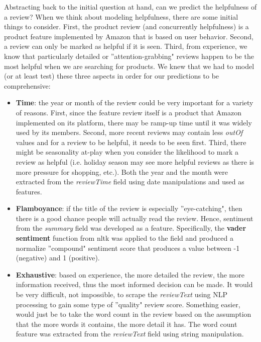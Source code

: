 \documentclass[12pt]{article}
\theoremstyle{plain}
\theoremstyle{definition}
\numberwithin{equation}{theorem}
\begin{document}
Abstracting back to the initial question at hand, can we predict the helpfulness of a review? When we think about modeling helpfulness, there are some initial things to consider. First, the product review (and concurrently helpfulness) is a product feature implemented by Amazon that is based on user behavior. Second, a review can only be marked as helpful if it is seen. Third, from experience, we know that particularly detailed or ''attention-grabbing" reviews happen to be the most helpful when we are searching for products. We knew that we had to model (or at least test) these three aspects in order for our predictions to be comprehensive:

\begin{itemize}
\item \textbf{Time}: the year or month of the review could be very important for a variety of reasons. First, since the feature review itself is a product that Amazon implemented on its platform, there may be ramp-up time until it was widely used by its members. Second, more recent reviews may contain less \textit{outOf} values and for a review to be helpful, it needs to be seen first. Third, there might be seasonality at-play when you consider the likelihood to mark a review as helpful (i.e. holiday season may see more helpful reviews as there is more pressure for shopping, etc.). Both the year and the month were extracted from the \textit{reviewTime} field using date manipulations and used as features.
\item \textbf{Flamboyance}: if the title of the review is especially ''eye-catching", then there is a good chance people will actually read the review. Hence, sentiment from the \textit{summary} field was developed as a feature. Specifically, the \textbf{vader sentiment} function from nltk was applied to the field and produced a normalize ''compound" sentiment score that produces a value between -1 (negative) and 1 (positive).
\item \textbf{Exhaustive}: based on experience, the more detailed the review, the more information received, thus the most informed decision can be made. It would be very difficult, not impossible, to scrape the \textit{reviewText} using NLP processing to gain some type of ''quality" review score. Something easier, would just be to take the word count in the review based on the assumption that the more words it contains, the more detail it has. The word count feature was extracted from the \textit{reviewText} field using string manipulation.
\end{itemize}
\end{document}
